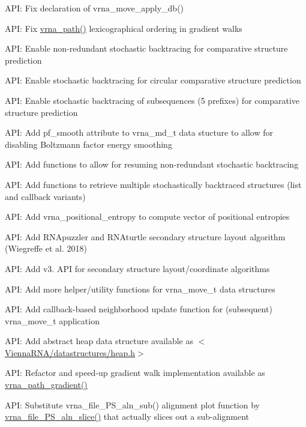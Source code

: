 \begin{DoxyItemize}
\item A\+PI\+: Fix declaration of {\ttfamily vrna\+\_\+move\+\_\+apply\+\_\+db()}
\item A\+PI\+: Fix {\ttfamily \mbox{\hyperlink{group__paths__walk_gaef7afadc36933b80706de49fe36e7b94}{vrna\+\_\+path()}}} lexicographical ordering in gradient walks
\item A\+PI\+: Enable non-\/redundant stochastic backtracing for comparative structure prediction
\item A\+PI\+: Enable stochastic backtracing for circular comparative structure prediction
\item A\+PI\+: Enable stochastic backtracing of subsequences (5\textquotesingle{} prefixes) for comparative structure prediction
\item A\+PI\+: Add {\ttfamily pf\+\_\+smooth} attribute to {\ttfamily vrna\+\_\+md\+\_\+t} data stucture to allow for disabling Boltzmann factor energy smoothing
\item A\+PI\+: Add functions to allow for resuming non-\/redundant stochastic backtracing
\item A\+PI\+: Add functions to retrieve multiple stochastically backtraced structures (list and callback variants)
\item A\+PI\+: Add {\ttfamily vrna\+\_\+positional\+\_\+entropy} to compute vector of positional entropies
\item A\+PI\+: Add {\ttfamily R\+N\+Apuzzler} and {\ttfamily R\+N\+Aturtle} secondary structure layout algorithm (Wiegreffe et al. 2018)
\item A\+PI\+: Add v3. A\+PI for secondary structure layout/coordinate algorithms
\item A\+PI\+: Add more helper/utility functions for {\ttfamily vrna\+\_\+move\+\_\+t} data structures
\item A\+PI\+: Add callback-\/based neighborhood update function for (subsequent) {\ttfamily vrna\+\_\+move\+\_\+t} application
\item A\+PI\+: Add abstract heap data structure available as {\ttfamily $<$\mbox{\hyperlink{heap_8h}{Vienna\+R\+N\+A/datastructures/heap.\+h}}$>$}
\item A\+PI\+: Refactor and speed-\/up gradient walk implementation available as {\ttfamily \mbox{\hyperlink{group__paths__walk_ga9594d7424dbe301f0dd3f4900db0f05c}{vrna\+\_\+path\+\_\+gradient()}}}
\item A\+PI\+: Substitute {\ttfamily vrna\+\_\+file\+\_\+\+P\+S\+\_\+aln\+\_\+sub()} alignment plot function by {\ttfamily \mbox{\hyperlink{group__alignment__plots_ga2b132dddeb2044e52dc39cf0ad8afaee}{vrna\+\_\+file\+\_\+\+P\+S\+\_\+aln\+\_\+slice()}}} that actually slices out a sub-\/alignment

\end{DoxyItemize}
